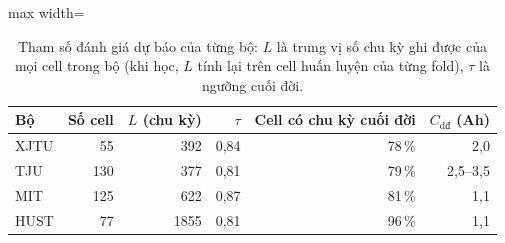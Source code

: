 \begin{table}[!htbp]\centering\small
\caption[Tham số đánh giá dự báo của từng bộ]{Tham số đánh giá dự báo của từng bộ: $L$ là trung vị số chu kỳ ghi được của mọi cell trong bộ (khi học, $L$ tính lại trên cell huấn luyện của từng fold), $\tau$ là ngưỡng cuối đời.}\label{tab:fcset}
\begin{adjustbox}{max width=\textwidth}\begin{tabular}{lrrrrr}\toprule
Bộ & Số cell & $L$ (chu kỳ) & $\tau$ & Cell có chu kỳ cuối đời & $C_\text{dđ}$ (Ah) \\\midrule
XJTU & 55 & 392 & 0{,}84 & 78\,\% & 2{,}0 \\
TJU & 130 & 377 & 0{,}81 & 79\,\% & 2{,}5--3{,}5 \\
MIT & 125 & 622 & 0{,}87 & 81\,\% & 1{,}1 \\
HUST & 77 & 1855 & 0{,}81 & 96\,\% & 1{,}1 \\
\bottomrule\end{tabular}\end{adjustbox}\end{table}
